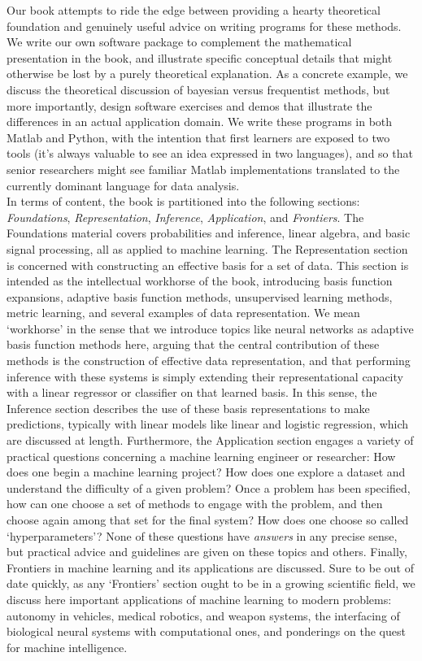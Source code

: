 \documentclass[10pt]{article}
\newenvironment{changemargin}[2]{%
\begin{list}{}{%
\setlength{\topsep}{0pt}%
\setlength{\leftmargin}{#1}%
\setlength{\rightmargin}{#2}%
\setlength{\listparindent}{\parindent}%
\setlength{\itemindent}{\parindent}%
\setlength{\parsep}{\parskip}%
}%
\item[]}{\end{list}}
\renewcommand{\it}{\textit}
\begin{document}
\begin{changemargin}{+-1cm}{-3cm}
Our book attempts to ride the edge between providing a hearty theoretical foundation and genuinely useful advice on writing programs for these methods. We write our own software package to complement the mathematical presentation in the book, and illustrate specific conceptual details that might otherwise be lost by a purely theoretical explanation. As a concrete example, we discuss the theoretical discussion of bayesian versus frequentist methods, but more importantly, design software exercises and demos that illustrate the differences in an actual application domain. We write these programs in both Matlab and Python, with the intention that first learners are exposed to two tools (it's always valuable to see an idea expressed in two languages), and so that senior researchers might see familiar Matlab implementations translated to the currently dominant language for data analysis. \\

In terms of content, the book is partitioned into the following sections: \it{Foundations}, \it{Representation},  \it{Inference}, \it{Application}, and \it{Frontiers}. The Foundations material covers probabilities and inference, linear algebra, and basic signal processing, all as applied to machine learning. The Representation section is concerned with constructing an effective basis for a set of data. This section is intended as the intellectual workhorse of the book, introducing basis function expansions, adaptive basis function methods, unsupervised learning methods, metric learning, and several examples of data representation. We mean `workhorse' in the sense that we introduce topics like neural networks as adaptive basis function methods here, arguing that the central contribution of these methods is the construction of effective data representation, and that performing inference with these systems is simply extending their representational capacity with a linear regressor or classifier on that learned basis. In this sense, the Inference section describes the use of these basis representations to make predictions, typically with linear models like linear and logistic regression, which are discussed at length. Furthermore, the Application section engages a variety of practical questions concerning a machine learning engineer or researcher: How does one begin a machine learning project? How does one explore a dataset and understand the difficulty of a given problem? Once a problem has been specified, how can one choose a set of methods to engage with the problem, and then choose again among that set for the final system? How does one choose so called `hyperparameters'? None of these questions have \it{answers} in any precise sense, but practical advice and guidelines are given on these topics and others. Finally, Frontiers in machine learning and its applications are discussed. Sure to be out of date quickly, as any `Frontiers' section ought to be in a growing scientific field, we discuss here important applications of machine learning to modern problems: autonomy in vehicles, medical robotics, and weapon systems, the interfacing of biological neural systems with computational ones, and ponderings on the quest for machine intelligence.


\end{changemargin}
\end{document}
